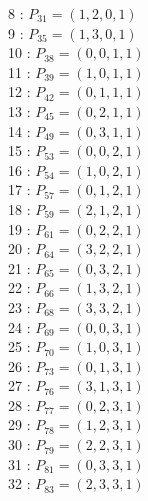 \documentclass{article}
\begin{document}
{\begin{multicols}{3}
8 : $P_{31}=( 1, 2, 0, 1 )$\\
9 : $P_{35}=( 1, 3, 0, 1 )$\\
10 : $P_{38}=( 0, 0, 1, 1 )$\\
11 : $P_{39}=( 1, 0, 1, 1 )$\\
12 : $P_{42}=( 0, 1, 1, 1 )$\\
13 : $P_{45}=( 0, 2, 1, 1 )$\\
14 : $P_{49}=( 0, 3, 1, 1 )$\\
15 : $P_{53}=( 0, 0, 2, 1 )$\\
16 : $P_{54}=( 1, 0, 2, 1 )$\\
17 : $P_{57}=( 0, 1, 2, 1 )$\\
18 : $P_{59}=( 2, 1, 2, 1 )$\\
19 : $P_{61}=( 0, 2, 2, 1 )$\\
20 : $P_{64}=( 3, 2, 2, 1 )$\\
21 : $P_{65}=( 0, 3, 2, 1 )$\\
22 : $P_{66}=( 1, 3, 2, 1 )$\\
23 : $P_{68}=( 3, 3, 2, 1 )$\\
24 : $P_{69}=( 0, 0, 3, 1 )$\\
25 : $P_{70}=( 1, 0, 3, 1 )$\\
26 : $P_{73}=( 0, 1, 3, 1 )$\\
27 : $P_{76}=( 3, 1, 3, 1 )$\\
28 : $P_{77}=( 0, 2, 3, 1 )$\\
29 : $P_{78}=( 1, 2, 3, 1 )$\\
30 : $P_{79}=( 2, 2, 3, 1 )$\\
31 : $P_{81}=( 0, 3, 3, 1 )$\\
32 : $P_{83}=( 2, 3, 3, 1 )$\\
\end{multicols}


%


%


}%
\end{document}
